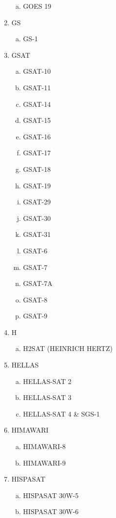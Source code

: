 \begin{multicols}{2}
\begin{enumerate}
\begin{enumerate}[a.]
    \item GOES 19
  \end{enumerate}
  \item GS
  \begin{enumerate}[a.]
    \item GS-1
  \end{enumerate}
  \item GSAT
  \begin{enumerate}[a.]
    \item GSAT-10
    \item GSAT-11
    \item GSAT-14
    \item GSAT-15
    \item GSAT-16
    \item GSAT-17
    \item GSAT-18
    \item GSAT-19
    \item GSAT-29
    \item GSAT-30
    \item GSAT-31
    \item GSAT-6
    \item GSAT-7
    \item GSAT-7A
    \item GSAT-8
    \item GSAT-9
  \end{enumerate}
  \item H
  \begin{enumerate}[a.]
    \item H2SAT (HEINRICH HERTZ)
  \end{enumerate}
  \item HELLAS
  \begin{enumerate}[a.]
    \item HELLAS-SAT 2
    \item HELLAS-SAT 3
    \item HELLAS-SAT 4 \& SGS-1
  \end{enumerate}
  \item HIMAWARI
  \begin{enumerate}[a.]
    \item HIMAWARI-8
    \item HIMAWARI-9
  \end{enumerate}
  \item HISPASAT
  \begin{enumerate}[a.]
    \item HISPASAT 30W-5
    \item HISPASAT 30W-6

\end{enumerate}
\end{enumerate}
\end{multicols}
